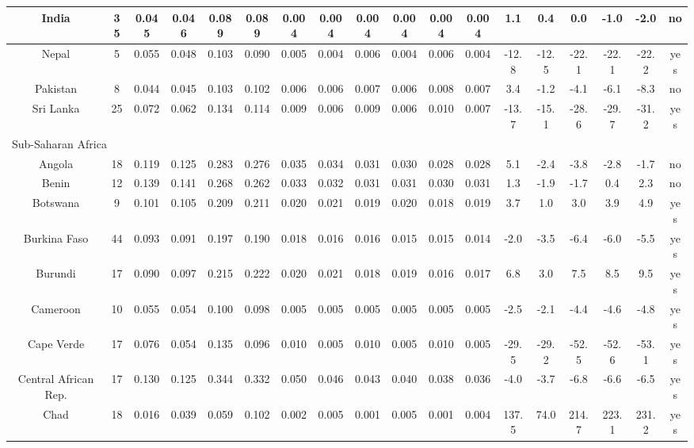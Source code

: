 \documentclass[10pt]{article}
\begin{document}
\begin{center}
\begin{tabular}{|c|c|c|c|c|c|c|c|c|c|c|c|c|c|c|c|c|c|}
\hline
India & 35 & 0.045 & 0.046 & 0.089 & 0.089 & 0.004 & 0.004 & 0.004 & 0.004 & 0.004 & 0.004 & 1.1 & 0.4 & 0.0 & -1.0 & -2.0 & no \\
\hline
Nepal & 5 & 0.055 & 0.048 & 0.103 & 0.090 & 0.005 & 0.004 & 0.006 & 0.004 & 0.006 & 0.004 & -12.8 & -12.5 & -22.1 & -22.1 & -22.2 & yes \\
\hline
Pakistan & 8 & 0.044 & 0.045 & 0.103 & 0.102 & 0.006 & 0.006 & 0.007 & 0.006 & 0.008 & 0.007 & 3.4 & -1.2 & -4.1 & -6.1 & -8.3 & no \\
\hline
Sri Lanka & 25 & 0.072 & 0.062 & 0.134 & 0.114 & 0.009 & 0.006 & 0.009 & 0.006 & 0.010 & 0.007 & -13.7 & -15.1 & -28.6 & -29.7 & -31.2 & yes \\
\hline
\multicolumn{18}{|l|}{Sub-Saharan Africa} \\
\hline
Angola & 18 & 0.119 & 0.125 & 0.283 & 0.276 & 0.035 & 0.034 & 0.031 & 0.030 & 0.028 & 0.028 & 5.1 & -2.4 & -3.8 & -2.8 & -1.7 & no \\
\hline
Benin & 12 & 0.139 & 0.141 & 0.268 & 0.262 & 0.033 & 0.032 & 0.031 & 0.031 & 0.030 & 0.031 & 1.3 & -1.9 & -1.7 & 0.4 & 2.3 & no \\
\hline
Botswana & 9 & 0.101 & 0.105 & 0.209 & 0.211 & 0.020 & 0.021 & 0.019 & 0.020 & 0.018 & 0.019 & 3.7 & 1.0 & 3.0 & 3.9 & 4.9 & yes \\
\hline
Burkina Faso & 44 & 0.093 & 0.091 & 0.197 & 0.190 & 0.018 & 0.016 & 0.016 & 0.015 & 0.015 & 0.014 & -2.0 & -3.5 & -6.4 & -6.0 & -5.5 & yes \\
\hline
Burundi & 17 & 0.090 & 0.097 & 0.215 & 0.222 & 0.020 & 0.021 & 0.018 & 0.019 & 0.016 & 0.017 & 6.8 & 3.0 & 7.5 & 8.5 & 9.5 & yes \\
\hline
Cameroon & 10 & 0.055 & 0.054 & 0.100 & 0.098 & 0.005 & 0.005 & 0.005 & 0.005 & 0.005 & 0.005 & -2.5 & -2.1 & -4.4 & -4.6 & -4.8 & yes \\
\hline
Cape Verde & 17 & 0.076 & 0.054 & 0.135 & 0.096 & 0.010 & 0.005 & 0.010 & 0.005 & 0.010 & 0.005 & -29.5 & -29.2 & -52.5 & -52.6 & -53.1 & yes \\
\hline
Central African Rep. & 17 & 0.130 & 0.125 & 0.344 & 0.332 & 0.050 & 0.046 & 0.043 & 0.040 & 0.038 & 0.036 & -4.0 & -3.7 & -6.8 & -6.6 & -6.5 & yes \\
\hline
Chad & 18 & 0.016 & 0.039 & 0.059 & 0.102 & 0.002 & 0.005 & 0.001 & 0.005 & 0.001 & 0.004 & 137.5 & 74.0 & 214.7 & 223.1 & 231.2 & yes \\

\end{tabular}
\end{center}
\end{document}
